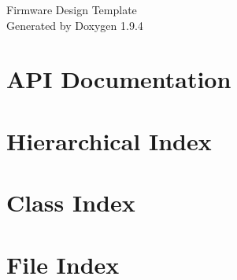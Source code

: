 \documentclass[twoside]{book}
\newcommand{\+}{\discretionary{\mbox{\scriptsize$\hookleftarrow$}}{}{}}
\newcommand{\clearemptydoublepage}{%
    \newpage{\pagestyle{empty}\cleardoublepage}%
  }
\begin{document}
  \raggedbottom
    \hypersetup{pageanchor=false,
                bookmarksnumbered=true,
                pdfencoding=unicode
               }
  \begin{titlepage}
  \vspace*{7cm}
  \begin{center}%
  {\Large Firmware Design Template}\\
  \vspace*{1cm}
  {\large Generated by Doxygen 1.9.4}\\
  \end{center}
  \end{titlepage}
  \clearemptydoublepage
  \tableofcontents
  \clearemptydoublepage
  \hypersetup{pageanchor=true}
\chapter{API Documentation}
\label{index}\hypertarget{index}{}
\chapter{Hierarchical Index}

\chapter{Class Index}

\chapter{File Index}

\end{document}

